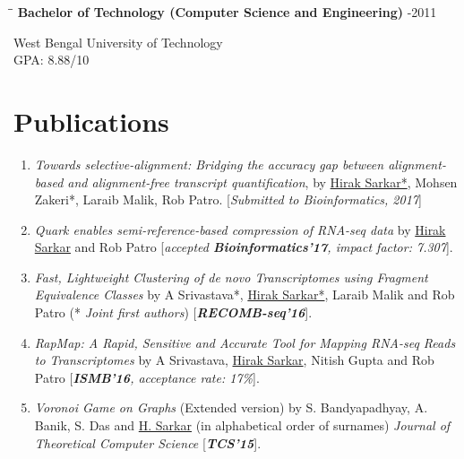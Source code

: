 \documentclass{res}
\begin{document}
\begin{resume}
\vspace{-0.1in}	
\begin{tabbing}
\hspace{2.3in}\= \hspace{2.6in}\= \kill %
{\bf Bachelor of Technology (Computer Science and Engineering)}  \>     -2011
\end{tabbing}  \vspace{-20pt}      %
West Bengal University of Technology     \\       
GPA: 8.88/10      \\   

\vspace{-0.9cm}
\section{Publications}
\begin{enumerate}

\item {\it Towards selective-alignment: Bridging the accuracy gap between alignment-based and alignment-free transcript quantification}, by \underline{Hirak Sarkar*}, Mohsen Zakeri*, Laraib Malik, Rob Patro. [\textit{Submitted to Bioinformatics, 2017}]

\item   {\it Quark enables semi-reference-based compression of RNA-seq data} by  \underline{Hirak Sarkar} and Rob Patro [\textit{accepted \textbf {Bioinformatics'17}, impact factor: 7.307}].


\item   {\it Fast, Lightweight Clustering of de novo Transcriptomes using Fragment Equivalence Classes} by A Srivastava*, \underline{Hirak Sarkar*}, Laraib Malik and Rob Patro (* \textit{Joint first authors}) [\textit{\textbf{RECOMB-seq'16}}]. 


\item {\it RapMap: A Rapid, Sensitive and Accurate Tool for Mapping RNA-seq Reads to Transcriptomes} by A Srivastava, \underline{Hirak Sarkar}, Nitish Gupta and Rob Patro  [\textit{\textbf{ISMB'16}, acceptance rate: 17\%}].

\item {\it Voronoi Game on Graphs} (Extended version) by S. Bandyapadhyay, A. Banik, S. Das and \underline{H. Sarkar} (in alphabetical order of surnames) {\it Journal of Theoretical Computer Science}  [\textit{\textbf{TCS'15}}].


\end{enumerate}
\end{resume}
\end{document}
